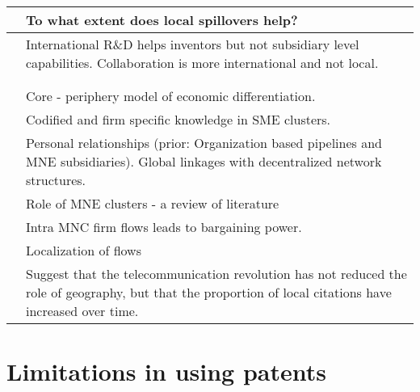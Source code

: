 \documentclass[12pt]{article}
\begin{document}
\begin{center}
\begin{longtable}{|p{}|p{}|}
\cite*{Huber2011} & To what extent does local spillovers help?\\\hline

\cite*{Alnuaimi2012a}& International R\&D helps inventors but not subsidiary level capabilities. Collaboration is more international and not local.\\\hline

\cite*{Alnuaimi2012b}&\\\hline

\cite*{Jaffe1993}&\\\hline

\cite*{Krugman1991a} & Core - periphery model of economic differentiation.\\\hline

\cite*{Lissoni2001} & Codified and firm specific knowledge in SME clusters.\\\hline

\cite*{Lorenzen2013} & Personal relationships (prior: Organization based pipelines and MNE subsidiaries). Global linkages with decentralized network structures.\\\hline

\cite*{Mudambi2012} & Role of MNE clusters - a review of literature\\\hline

\cite*{Mudambi2004} & Intra MNC firm flows leads to bargaining power.\\\hline

\cite*{Murata2014} & Localization of flows\\\hline

\cite*{Sonn2008}&Suggest that the telecommunication revolution has not reduced the role of geography, but that the proportion of local citations have increased over time.\\\hline

\end{longtable}
\end{center}

\section{Limitations in using patents}
\cite*{Griliches1990}
\cite*{Scherer1984}
 

\end{document}
